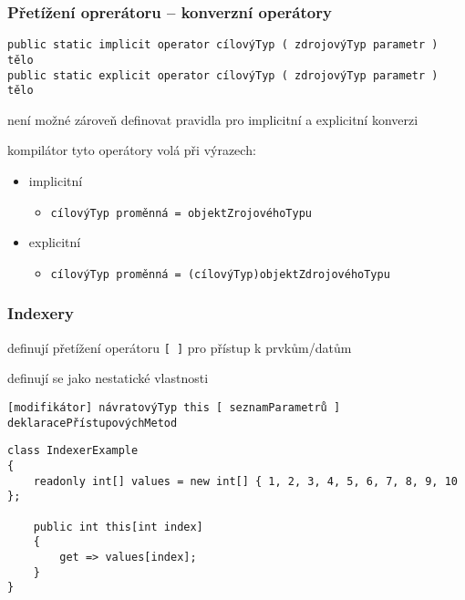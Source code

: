 \begin{frame}[fragile]
\frametitle{Přetížení oprerátoru -- konverzní operátory}
\vfill
\begin{noteblock}{}
\begin{lstlisting}
public static implicit operator cílovýTyp ( zdrojovýTyp parametr ) tělo
public static explicit operator cílovýTyp ( zdrojovýTyp parametr ) tělo
\end{lstlisting}
\end{noteblock}
\vfill
\begin{bitemize}{}
\item není možné zároveň definovat pravidla pro implicitní a explicitní konverzi
\item kompilátor tyto operátory volá při výrazech:
\begin{itemize}
\item implicitní
\begin{itemize}
\item \lstinline|cílovýTyp proměnná = objektZrojovéhoTypu|
\end{itemize}

\item explicitní
\begin{itemize}
\item \lstinline|cílovýTyp proměnná = (cílovýTyp)objektZdrojovéhoTypu|
\end{itemize}
\end{itemize}

\end{bitemize}
\vfill
\end{frame}

\zkouskove

\begin{frame}[fragile]
\frametitle{Indexery}
\vfill
\begin{bitemize}{}
\item definují přetížení operátoru \lstinline|[ ]| pro přístup k prvkům/datům
\item definují se jako nestatické vlastnosti
\end{bitemize}
\vfill
\begin{noteblock}{}
\begin{lstlisting}
[modifikátor] návratovýTyp this [ seznamParametrů ] deklaracePřístupovýchMetod
\end{lstlisting}
\end{noteblock}
\vfill
\begin{yesblock}
\begin{lstlisting}
class IndexerExample
{
    readonly int[] values = new int[] { 1, 2, 3, 4, 5, 6, 7, 8, 9, 10 };

    public int this[int index]
    {
        get => values[index];
    }
}
\end{lstlisting}
\end{yesblock}
\vfill
\end{frame}


